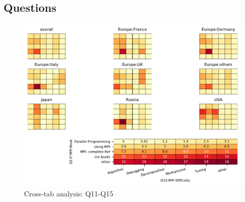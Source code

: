 
\subsection{Questions}


\begin{figure}
\begin{center}
\includegraphics[width=12cm]{../pdfs/Q11-Q15.pdf}
\caption{Cross-tab analysis: Q11-Q15}
\label{fig:Q11-Q15}
\end{center}
\end{figure}

